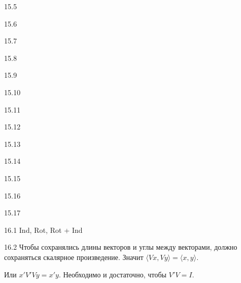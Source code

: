 \protect \hypertarget {soln:15.5}{}
\begin{solution}{{15.5}}
\end{solution}
\protect \hypertarget {soln:15.6}{}
\begin{solution}{{15.6}}
\end{solution}
\protect \hypertarget {soln:15.7}{}
\begin{solution}{{15.7}}
\end{solution}
\protect \hypertarget {soln:15.8}{}
\begin{solution}{{15.8}}
\end{solution}
\protect \hypertarget {soln:15.9}{}
\begin{solution}{{15.9}}
\end{solution}
\protect \hypertarget {soln:15.10}{}
\begin{solution}{{15.10}}
\end{solution}
\protect \hypertarget {soln:15.11}{}
\begin{solution}{{15.11}}
\end{solution}
\protect \hypertarget {soln:15.12}{}
\begin{solution}{{15.12}}
\end{solution}
\protect \hypertarget {soln:15.13}{}
\begin{solution}{{15.13}}
\end{solution}
\protect \hypertarget {soln:15.14}{}
\begin{solution}{{15.14}}
\end{solution}
\protect \hypertarget {soln:15.15}{}
\begin{solution}{{15.15}}
\end{solution}
\protect \hypertarget {soln:15.16}{}
\begin{solution}{{15.16}}
\end{solution}
\protect \hypertarget {soln:15.17}{}
\begin{solution}{{15.17}}
\end{solution}
\protect \hypertarget {soln:16.1}{}
\begin{solution}{{16.1}}
 Ind, Rot, Rot + Ind
\end{solution}
\protect \hypertarget {soln:16.2}{}
\begin{solution}{{16.2}}
  Чтобы сохранялись длины векторов и углы между векторами,
  должно сохраняться скалярное произведение. Значит $\langle Vx, Vy \rangle = \langle x, y \rangle$.

  Или $x'V'Vy=x'y$. Необходимо и достаточно, чтобы $V'V=I$.
\end{solution}
